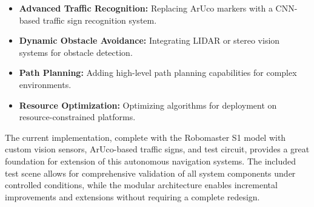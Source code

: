 \documentclass[9pt,technote]{IEEEtran}
\begin{document}
\begin{itemize}
    \item \textbf{Advanced Traffic Recognition:} Replacing ArUco markers with a CNN-based traffic sign recognition system.
    \item \textbf{Dynamic Obstacle Avoidance:} Integrating LIDAR or stereo vision systems for obstacle detection.
    \item \textbf{Path Planning:} Adding high-level path planning capabilities for complex environments.
    \item \textbf{Resource Optimization:} Optimizing algorithms for deployment on resource-constrained platforms.
\end{itemize}

The current implementation, complete with the Robomaster S1 model with custom vision sensors, ArUco-based traffic signs, and test circuit, provides a great foundation for extension of this autonomous navigation systems. The included test scene allows for comprehensive validation of all system components under controlled conditions, while the modular architecture enables incremental improvements and extensions without requiring a complete redesign.
\end{document}

